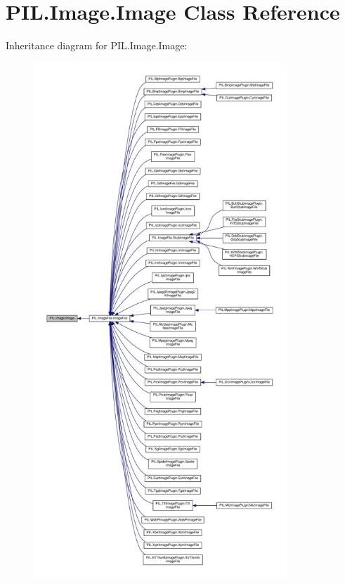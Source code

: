 \hypertarget{classPIL_1_1Image_1_1Image}{}\section{P\+I\+L.\+Image.\+Image Class Reference}
\label{classPIL_1_1Image_1_1Image}


Inheritance diagram for P\+I\+L.\+Image.\+Image\+:
\nopagebreak
\begin{figure}[H]
\begin{center}
\leavevmode
\includegraphics[height=550pt]{classPIL_1_1Image_1_1Image__inherit__graph}
\end{center}
\end{figure}
